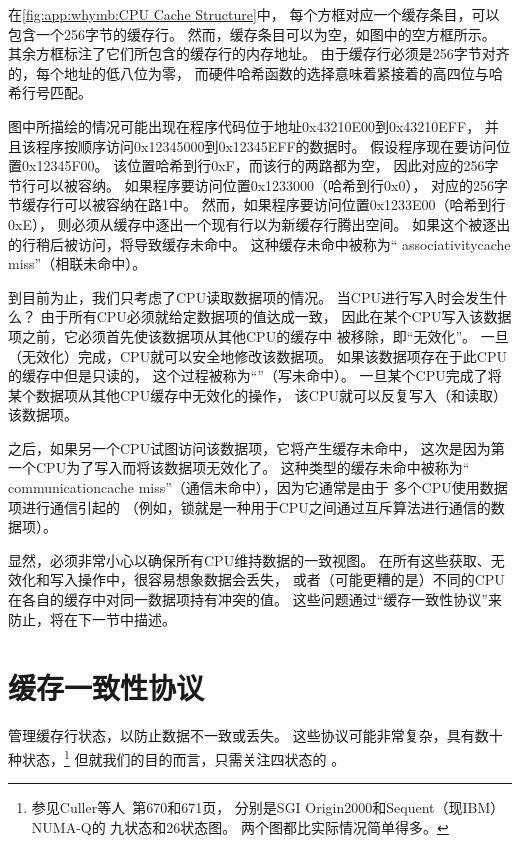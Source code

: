 在\cref{fig:app:whymb:CPU Cache Structure}中，
每个方框对应一个缓存条目，可以包含一个256字节的缓存行。
然而，缓存条目可以为空，如图中的空方框所示。
其余方框标注了它们所包含的缓存行的内存地址。
由于缓存行必须是256字节对齐的，每个地址的低八位为零，
而硬件哈希函数的选择意味着紧接着的高四位与哈希行号匹配。

图中所描绘的情况可能出现在程序代码位于地址0x43210E00到0x43210EFF，
并且该程序按顺序访问0x12345000到0x12345EFF的数据时\@。
假设程序现在要访问位置0x12345F00。
该位置哈希到行0xF，而该行的两路都为空，
因此对应的256字节行可以被容纳。
如果程序要访问位置0x1233000（哈希到行0x0），
对应的256字节缓存行可以被容纳在路1中。
然而，如果程序要访问位置0x1233E00（哈希到行0xE），
则必须从缓存中逐出一个现有行以为新缓存行腾出空间。
如果这个被逐出的行稍后被访问，将导致缓存未命中。
这种缓存未命中被称为``
{associativity}{cache miss}''（相联未命中）。

到目前为止，我们只考虑了CPU读取数据项的情况。
当CPU进行写入时会发生什么？
由于所有CPU必须就给定数据项的值达成一致，
因此在某个CPU写入该数据项之前，它必须首先使该数据项从其他CPU的缓存中
被移除，即``无效化''。
一旦（无效化）完成，CPU就可以安全地修改该数据项。
如果该数据项存在于此CPU的缓存中但是只读的，
这个过程被称为``''（写未命中）。
一旦某个CPU完成了将某个数据项从其他CPU缓存中无效化的操作，
该CPU就可以反复写入（和读取）该数据项。

之后，如果另一个CPU试图访问该数据项，它将产生缓存未命中，
这次是因为第一个CPU为了写入而将该数据项无效化了。
这种类型的缓存未命中被称为``
{communication}{cache miss}''（通信未命中），因为它通常是由于
多个CPU使用数据项进行通信引起的
（例如，锁就是一种用于CPU之间通过互斥算法进行通信的数据项）。

显然，必须非常小心以确保所有CPU维持数据的一致视图。
在所有这些获取、无效化和写入操作中，很容易想象数据会丢失，
或者（可能更糟的是）不同的CPU在各自的缓存中对同一数据项持有冲突的值。
这些问题通过``缓存一致性协议''来防止，将在下一节中描述。

\section{缓存一致性协议}
\label{sec:app:whymb:Cache-Coherence Protocols}

管理缓存行状态，以防止数据不一致或丢失。
这些协议可能非常复杂，具有数十种状态，\footnote{
	参见Culler等人~\cite{DavidECuller1999}第670和671页，
	分别是SGI Origin2000和Sequent（现IBM）NUMA-Q的
	九状态和26状态图。
	两个图都比实际情况简单得多。}
但就我们的目的而言，只需关注四状态的
。

